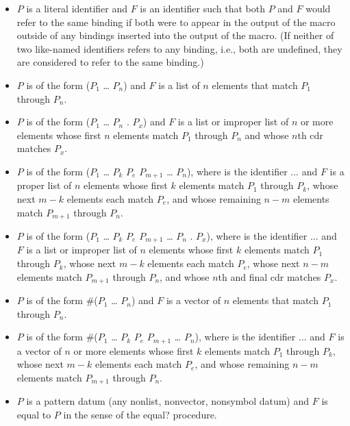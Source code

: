 \begin{entry}{%
}
\begin{itemize}
\item $P$ is a literal identifier
and $F$ is an identifier such that both $P$ and $F$ would refer to the
same binding if both were to appear in the output of the macro outside
of any bindings inserted into the output of the macro.
(If neither of two like-named identifiers refers to any binding, i.e., both
are undefined, they are considered to refer to the same binding.)

\item $P$ is of the form
{\cf ($P_1$ \dots{} $P_n$)}
and $F$ is a list of $n$ elements that match $P_1$ through
$P_n$.

\item $P$ is of the form
{\cf ($P_1$ \dots{} $P_n$ . $P_x$)}
and $F$ is a list or improper list of $n$ or more elements
whose first $n$ elements match $P_1$ through $P_n$
and
whose $n$th cdr matches $P_x$.

\item $P$ is of the form
{\cf ($P_1$ \dots{} $P_k$ $P_e$  $P_{m+1}$ \dots{} $P_n$)},
where  is the identifier {\cf ...}
and $F$ is a proper list of $n$
elements whose first $k$ elements match $P_1$ through $P_k$,
whose next $m-k$ elements each match $P_e$,
and
whose remaining $n-m$ elements match $P_{m+1}$ through $P_n$.

\item $P$ is of the form
{\cf ($P_1$ \dots{} $P_k$ $P_e$  $P_{m+1}$ \dots{} $P_n$ . $P_x$)},
where  is the identifier {\cf ...}
and $F$ is a list or improper list of $n$
elements whose first $k$ elements match $P_1$ through $P_k$,
whose next $m-k$ elements each match $P_e$,
whose next $n-m$ elements match $P_{m+1}$ through $P_n$,
and 
whose $n$th and final cdr matches $P_x$.

\item $P$ is of the form
{\cf \#($P_1$ \dots{} $P_n$)}
and $F$ is a vector of $n$ elements that match $P_1$ through
$P_n$.

\item $P$ is of the form
{\cf \#($P_1$ \dots{} $P_k$ $P_e$  $P_{m+1}$ \dots{} $P_n$)},
where  is the identifier {\cf ...}
and $F$ is a vector of $n$ or more elements
whose first $k$ elements match $P_1$ through $P_k$,
whose next $m-k$ elements each match $P_e$,
and
whose remaining $n-m$ elements match $P_{m+1}$ through $P_n$.

\item $P$ is a pattern datum (any nonlist, nonvector, nonsymbol
datum) and $F$ is equal to $P$ in the sense of the
{\cf equal?} procedure.
\end{itemize}


\end{entry}
